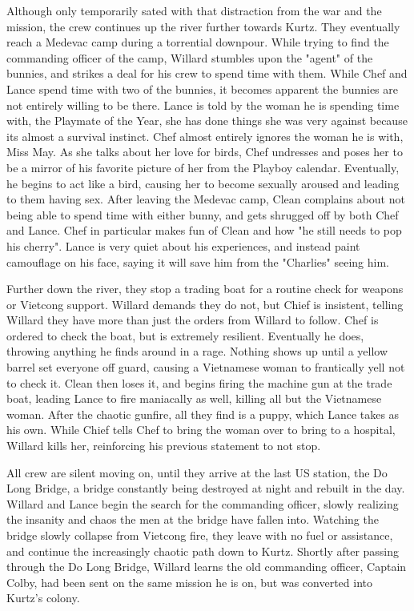 \documentclass[a4paper,man,natbib]{apa6}
\begin{document}
Although only temporarily sated with that distraction from the war and the mission, the crew continues up the river further towards Kurtz. They eventually reach a Medevac camp during a torrential downpour. While trying to find the commanding officer of the camp, Willard stumbles upon the "agent" of the bunnies, and strikes a deal for his crew to spend time with them. While Chef and Lance spend time with two of the bunnies, it becomes apparent the bunnies are not entirely willing to be there. Lance is told by the woman he is spending time with, the Playmate of the Year, she has done things she was very against because its almost a survival instinct. Chef almost entirely ignores the woman he is with, Miss May. As she talks about her love for birds, Chef undresses and poses her to be a mirror of his favorite picture of her from the Playboy calendar. Eventually, he begins to act like a bird, causing her to become sexually aroused and leading to them having sex. After leaving the Medevac camp, Clean complains about not being able to spend time with either bunny, and gets shrugged off by both Chef and Lance. Chef in particular makes fun of Clean and how "he still needs to pop his cherry". Lance is very quiet about his experiences, and instead paint camouflage on his face, saying it will save him from the "Charlies" seeing him.

Further down the river, they stop a trading boat for a routine check for weapons or Vietcong support. Willard demands they do not, but Chief is insistent, telling Willard they have more than just the orders from Willard to follow. Chef is ordered to check the boat, but is extremely resilient. Eventually he does, throwing anything he finds around in a rage. Nothing shows up until a yellow barrel set everyone off guard, causing a Vietnamese woman to frantically yell not to check it. Clean then loses it, and begins firing the machine gun at the trade boat, leading Lance to fire maniacally as well, killing all but the Vietnamese woman. After the chaotic gunfire, all they find is a puppy, which Lance takes as his own. While Chief tells Chef to bring the woman over to bring to a hospital, Willard kills her, reinforcing his previous statement to not stop.

All crew are silent moving on, until they arrive at the last US station, the Do Long Bridge, a bridge constantly being destroyed at night and rebuilt in the day. Willard and Lance begin the search for the commanding officer, slowly realizing the insanity and chaos the men at the bridge have fallen into. Watching the bridge slowly collapse from Vietcong fire, they leave with no fuel or  assistance, and continue the increasingly chaotic path down to Kurtz. Shortly after passing through the Do Long Bridge, Willard learns the old commanding officer, Captain Colby, had been sent on the same mission he is on, but was converted into Kurtz's colony.
\end{document}
